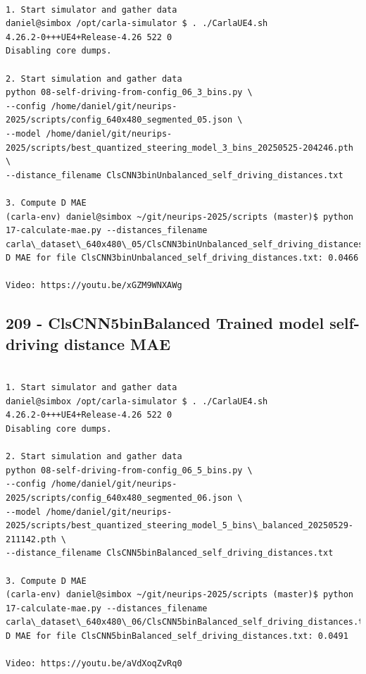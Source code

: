 \begin{verbatim}

1. Start simulator and gather data
daniel@simbox /opt/carla-simulator $ . ./CarlaUE4.sh 
4.26.2-0+++UE4+Release-4.26 522 0
Disabling core dumps.

2. Start simulation and gather data
python 08-self-driving-from-config_06_3_bins.py \
--config /home/daniel/git/neurips-2025/scripts/config_640x480_segmented_05.json \
--model /home/daniel/git/neurips-2025/scripts/best_quantized_steering_model_3_bins_20250525-204246.pth \
--distance_filename ClsCNN3binUnbalanced_self_driving_distances.txt

3. Compute D MAE
(carla-env) daniel@simbox ~/git/neurips-2025/scripts (master)$ python 17-calculate-mae.py --distances_filename carla\_dataset\_640x480\_05/ClsCNN3binUnbalanced_self_driving_distances.txt
D MAE for file ClsCNN3binUnbalanced_self_driving_distances.txt: 0.0466

Video: https://youtu.be/xGZM9WNXAWg

\end{verbatim}

\subsection{209 - ClsCNN5binBalanced Trained model self-driving distance MAE}
\label{app_res:209}

\begin{verbatim}

1. Start simulator and gather data
daniel@simbox /opt/carla-simulator $ . ./CarlaUE4.sh 
4.26.2-0+++UE4+Release-4.26 522 0
Disabling core dumps.

2. Start simulation and gather data
python 08-self-driving-from-config_06_5_bins.py \
--config /home/daniel/git/neurips-2025/scripts/config_640x480_segmented_06.json \
--model /home/daniel/git/neurips-2025/scripts/best_quantized_steering_model_5_bins\_balanced_20250529-211142.pth \
--distance_filename ClsCNN5binBalanced_self_driving_distances.txt

3. Compute D MAE
(carla-env) daniel@simbox ~/git/neurips-2025/scripts (master)$ python 17-calculate-mae.py --distances_filename carla\_dataset\_640x480\_06/ClsCNN5binBalanced_self_driving_distances.txt
D MAE for file ClsCNN5binBalanced_self_driving_distances.txt: 0.0491

Video: https://youtu.be/aVdXoqZvRq0

\end{verbatim}

